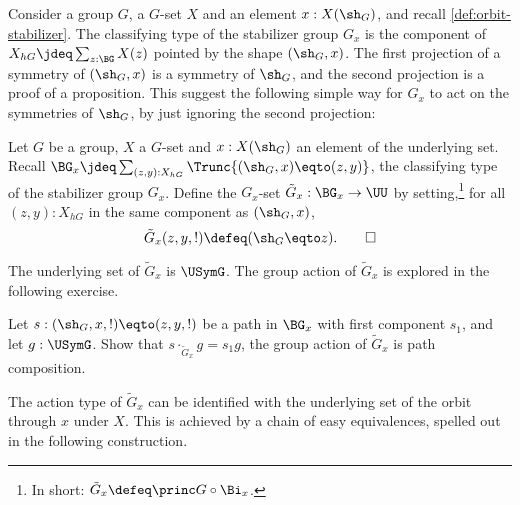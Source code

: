 Consider a group $G$, a $G$-set $X$ and an element $x:X(\sh_G)$,
and recall \cref{def:orbit-stabilizer}.
The classifying type of the stabilizer group $G_x$
is the component of $X_{hG}\jdeq\sum_{z:\BG} X(z)$ 
pointed by the shape $(\sh_G,x)$.
The first projection of a symmetry of $(\sh_G,x)$ is a symmetry of 
$\sh_G$, and the second projection is a proof of a proposition.
This suggest the following simple way for $G_x$ to act on the
symmetries of $\sh_G$, by just ignoring the second projection:


\begin{definition}\label{def:Gx-action-on-G}
Let $G$ be a group, $X$ a $G$-set and $x:X(\sh_G)$ an element of 
the underlying set. Recall 
$\BG_x \jdeq \sum_{(z,y):X_{hG}}\Trunc{(\sh_G,x)\eqto(z,y)}$,
the classifying type of the stabilizer group $G_x$. 
Define the $G_x$-set $\tilde G_x : \BG_x \to \UU$ by setting,\footnote{%
In short: $\tilde G_x \defeq \princ G \circ \Bi_x$.\label{ft:restriction}}
for all $(z,y):X_{hG}$ in the same component as $(\sh_G,x)$, 
\[
\tilde G_x(z,y,!)\defeq(\sh_G\eqto z).\qedhere
\]

\end{definition} 

The underlying set of $\tilde G_x$ is $\USymG$. The group action of
$\tilde G_x$ is explored in the following exercise.

\begin{xca}\label{xca:Gx-action-on-G}
Let $s:(\sh_G,x,!)\eqto(z,y,!)$ be a path in $\BG_x$ with first component
$s_1$, and let $g:\USymG$. Show that $s\cdot_{\tilde G_x} g = s_1 g$, \ie
the group action of $\tilde G_x$ is path composition. 
\end{xca}

The action type of $\tilde G_x$ can be identified with the 
underlying set of the orbit through $x$ under $X$. This is 
achieved by a chain of easy equivalences, spelled
out in the following construction.


